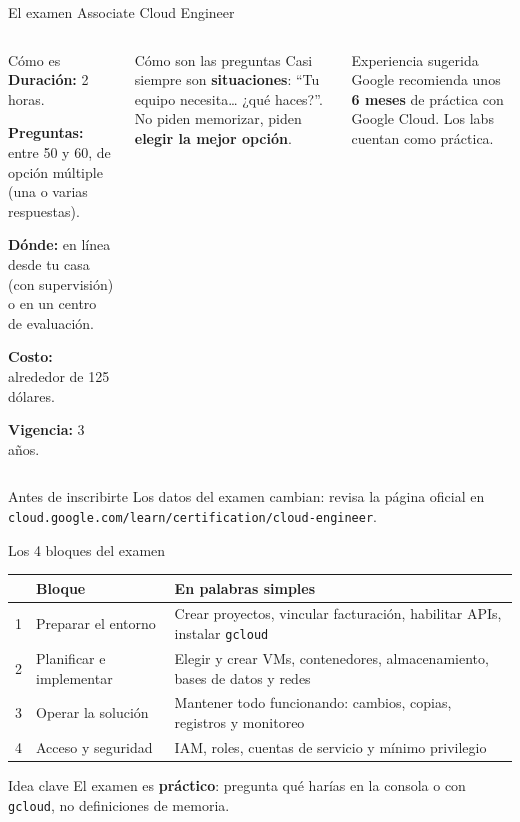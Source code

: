 \documentclass[aspectratio=169,10pt,c]{beamer}
\begin{document}
\begin{frame}{El examen Associate Cloud Engineer}
\begin{columns}[T,onlytextwidth]
\begin{block}{Cómo es}
\small
\textbf{Duración:} 2 horas.\par\smallskip
\textbf{Preguntas:} entre 50 y 60, de opción múltiple (una o varias respuestas).\par\smallskip
\textbf{Dónde:} en línea desde tu casa (con supervisión) o en un centro de evaluación.\par\smallskip
\textbf{Costo:} alrededor de 125 dólares.\par\smallskip
\textbf{Vigencia:} 3 años.
\end{block}
\begin{exampleblock}{Cómo son las preguntas}
\small Casi siempre son \textbf{situaciones}: ``Tu equipo necesita\ldots{} ¿qué haces?''. No piden memorizar, piden \textbf{elegir la mejor opción}.
\end{exampleblock}
\begin{block}{Experiencia sugerida}
\small Google recomienda unos \textbf{6 meses} de práctica con Google Cloud. Los labs cuentan como práctica.
\end{block}
\end{columns}
\par\vspace{1mm}
\begin{alertblock}{Antes de inscribirte}
\small Los datos del examen cambian: revisa la página oficial en \texttt{cloud.google.com/learn/certification/cloud-engineer}.
\end{alertblock}
\end{frame}

\begin{frame}{Los 4 bloques del examen}
\renewcommand{\arraystretch}{1.35}
\centering\small
\begin{tabular}{@{}p{0.6cm}p{5.2cm}p{6.8cm}@{}}
\toprule
& \textbf{Bloque} & \textbf{En palabras simples}\\
\midrule
1 & Preparar el entorno & Crear proyectos, vincular facturación, habilitar APIs, instalar \texttt{gcloud}\\
2 & Planificar e implementar & Elegir y crear VMs, contenedores, almacenamiento, bases de datos y redes\\
3 & Operar la solución & Mantener todo funcionando: cambios, copias, registros y monitoreo\\
4 & Acceso y seguridad & IAM, roles, cuentas de servicio y mínimo privilegio\\
\bottomrule
\end{tabular}
\par\vspace{4mm}
\begin{block}{Idea clave}
\small El examen es \textbf{práctico}: pregunta qué harías en la consola o con \texttt{gcloud}, no definiciones de memoria.
\end{block}
\end{frame}
\end{document}
